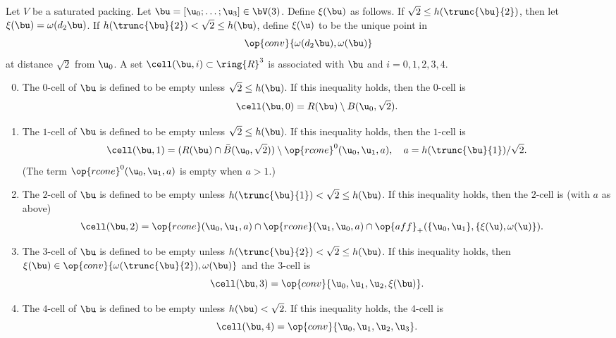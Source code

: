 \begin{definition} 
  Let $V$ be a saturated packing.  Let $\bu=[\u_0;\ldots;\u_3]\in
  \bV(3)$.  Define $\xi(\bu)$ as follows.  If $\sqrt2\le
  h(\trunc{\bu}{2})$, then let $\xi(\bu)=\omega(d_2\bu)$.  If
  $h(\trunc{\bu}{2})<\sqrt2\le h(\bu)$, define $\xi(\u)$
  to be the unique point in
\[
\op{conv}\{\omega(d_2\bu),\omega(\bu)\}
\]
at distance $\sqrt2$ from $\u_0$.  
A set $\cell(\bu,i)\subset\ring{R}^3$ is associated with $\bu$ and
$i=0,1,2,3,4$.  \hfill\break\smallskip
\begin{enumerate}
\setcounter{enumi}{-1}
\item %
The $0$-cell of $\bu$ is defined to be empty unless $\sqrt2 \le h(\bu)$.
If this inequality holds, then the $0$-cell is
\[  
\cell(\bu,0) = R(\bu)\setminus B(\u_0,\sqrt2).%
\] 
\bigskip
\item The $1$-cell of $\bu$ is defined to be empty unless $\sqrt2 \le
  h(\bu)$.  If this inequality holds, then the $1$-cell is
\[  
\cell(\bu,1) = (R(\bu) \cap  \bar B(\u_0,\sqrt2))
\setminus \op{rcone}^0(\u_0,\u_1,a),
\quad a={h(\trunc{\bu}{1})}/{\sqrt2}.
\] 
(The term $\op{rcone}^0(\u_0,\u_1,a)$ is empty when $a>1$.)
\bigskip
\item The $2$-cell of $\bu$ is defined to be empty unless
  $h(\trunc{\bu}{1})<\sqrt2\le h(\bu)$.  If this inequality holds,
  then the $2$-cell is (with $a$ as above)
\begin{align*} 
\cell(\bu,2) &= 
 \op{rcone}(\u_0,\u_1,a)\cap \op{rcone}(\u_1,\u_0,a)\cap 
\op{aff}_+(\{\u_0,\u_1\},\{\xi(\u),\omega(\u)\}).
\end{align*}
\bigskip
\item
The $3$-cell of $\bu$ is defined to be empty unless 
$h(\trunc{\bu}{2}) <\sqrt2 \le h(\bu)$.
If this inequality holds, then $\xi(\bu)\in \op{conv}
\{\omega(\trunc{\bu}{2}),\omega(\bu)\}$
and  the $3$-cell is
\[  
\cell(\bu,3) = \op{conv}\{ \u_0, \u_1, \u_2,\xi(\bu)\}.
\] 
\bigskip
\item
The $4$-cell of $\bu$ is defined to be empty unless
$h(\bu) <\sqrt2$.
If this inequality holds, the $4$-cell is
\[  
\cell(\bu,4) = \op{conv}\{ \u_0, \u_1, \u_2, \u_3\}.
\] 
\end{enumerate}
\end{definition}
